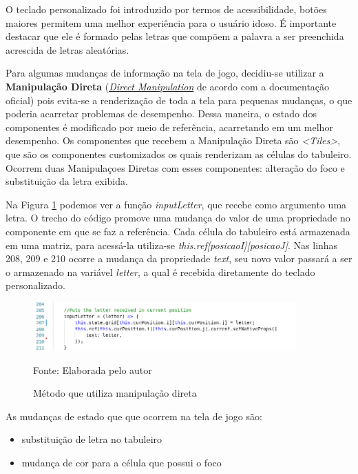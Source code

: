 O teclado personalizado foi introduzido por termos de acessibilidade, botões maiores permitem uma melhor experiência para o usuário idoso. É importante destacar que ele é formado pelas letras que compõem a palavra a ser preenchida acrescida de letras aleatórias.

Para algumas mudanças de informação na tela de jogo, decidiu-se utilizar a \textbf{Manipulação Direta} (\href{https://reactnative.dev/docs/direct-manipulation}{\textit{Direct Manipulation}} de acordo com a documentação oficial) pois evita-se a renderização de toda a tela para pequenas mudanças, o que poderia acarretar problemas de desempenho. Dessa maneira, o estado dos componentes é modificado por meio de referência, acarretando em um melhor desempenho. Os componentes que recebem a Manipulação Direta são \textit{<Tiles>}, que são os componentes customizados os quais renderizam as células do tabuleiro. Ocorrem duas Manipulaçoes Diretas com esses componentes: alteração do foco e substituição da letra exibida.

Na Figura \ref{fig:codeDirectManipulation} podemos ver a função \textit{inputLetter}, que recebe como argumento uma letra. O trecho do código promove uma mudança do valor de uma propriedade no componente em que se faz a referência. Cada célula do tabuleiro está armazenada em uma matriz, para acessá-la utiliza-se \textit{this.ref[posicaoI][posicaoJ]}. Nas linhas 208, 209 e 210 ocorre a mudança da propriedade \textit{text}, seu novo valor passará a ser o armazenado na variável \textit{letter}, a qual é recebida diretamente do teclado personalizado.

\begin{figure}[H]
\centering
    \caption{Método que utiliza manipulação direta}
    \label{fig:codeDirectManipulation}
    \includegraphics[width=0.9\textwidth]{Figuras/codeDirectManipulation.png}
    
    Fonte: Elaborada pelo autor
\end{figure}

As mudanças de estado que que ocorrem na tela de jogo são:

\begin{itemize}
    \item substituição de letra no tabuleiro
    \item mudança de cor para a célula que possui o foco
\end{itemize}